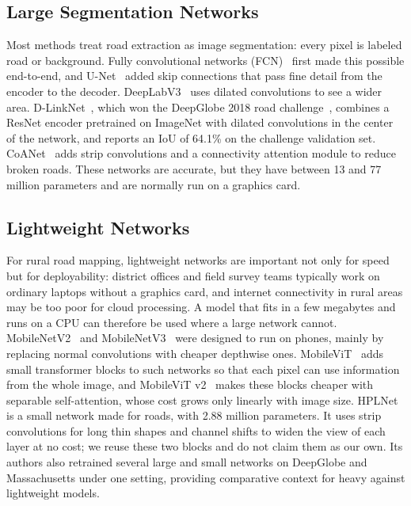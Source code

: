 \documentclass{ieeeaccess}
\begin{document}
\subsection{Large Segmentation Networks}

Most methods treat road extraction as image segmentation: every pixel is labeled road or background. Fully convolutional networks (FCN)~\cite{long2015fcn} first made this possible end-to-end, and U-Net~\cite{ronneberger2015unet} added skip connections that pass fine detail from the encoder to the decoder. DeepLabV3~\cite{chen2017deeplab} uses dilated convolutions to see a wider area. D-LinkNet~\cite{zhou2018dlinknet}, which won the DeepGlobe 2018 road challenge~\cite{demir2018deepglobe}, combines a ResNet encoder pretrained on ImageNet with dilated convolutions in the center of the network, and reports an IoU of 64.1\% on the challenge validation set. CoANet~\cite{mei2021coanet} adds strip convolutions and a connectivity attention module to reduce broken roads. These networks are accurate, but they have between 13 and 77 million parameters and are normally run on a graphics card.

\subsection{Lightweight Networks}

For rural road mapping, lightweight networks are important not only for speed but for deployability: district offices and field survey teams typically work on ordinary laptops without a graphics card, and internet connectivity in rural areas may be too poor for cloud processing. A model that fits in a few megabytes and runs on a CPU can therefore be used where a large network cannot. MobileNetV2~\cite{sandler2018mobilenetv2} and MobileNetV3~\cite{howard2019mobilenetv3} were designed to run on phones, mainly by replacing normal convolutions with cheaper depthwise ones. MobileViT~\cite{mehta2022mobilevit} adds small transformer blocks to such networks so that each pixel can use information from the whole image, and MobileViT v2~\cite{mehta2023separable} makes these blocks cheaper with separable self-attention, whose cost grows only linearly with image size. HPLNet~\cite{cui2025hplnet} is a small network made for roads, with 2.88 million parameters. It uses strip convolutions for long thin shapes and channel shifts to widen the view of each layer at no cost; we reuse these two blocks and do not claim them as our own. Its authors also retrained several large and small networks on DeepGlobe and Massachusetts under one setting, providing comparative context for heavy against lightweight models.
\end{document}
